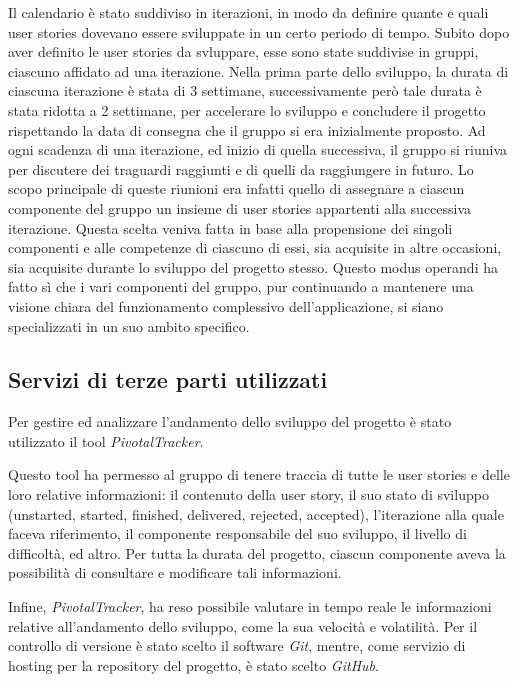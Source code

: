 \documentclass[binding=0.6cm,Lau]{sapthesis}
\begin{document}
Il calendario è stato suddiviso in iterazioni, in modo da definire
quante e quali user stories dovevano essere sviluppate in un certo
periodo di tempo. Subito dopo aver definito le user stories da
svluppare, esse sono state suddivise in gruppi, ciascuno affidato ad
una iterazione. Nella prima parte dello sviluppo, la durata di
ciascuna iterazione è stata di 3 settimane, successivamente però tale
durata è stata ridotta a 2 settimane, per accelerare lo sviluppo e
concludere il progetto rispettando la data di consegna che il gruppo
si era inizialmente proposto.  Ad ogni scadenza di una iterazione, ed
inizio di quella successiva, il gruppo si riuniva per discutere dei
traguardi raggiunti e di quelli da raggiungere in futuro. Lo scopo
principale di queste riunioni era infatti quello di assegnare a
ciascun componente del gruppo un insieme di user stories appartenti
alla successiva iterazione.  Questa scelta veniva fatta in base alla
propensione dei singoli componenti e alle competenze di ciascuno di
essi, sia acquisite in altre occasioni, sia acquisite durante lo
sviluppo del progetto stesso. Questo modus operandi ha fatto sì che i
vari componenti del gruppo, pur continuando a mantenere una visione
chiara del funzionamento complessivo dell'applicazione, si siano
specializzati in un suo ambito specifico.

\subsection{Servizi di terze parti utilizzati}

Per gestire ed analizzare l'andamento dello sviluppo del progetto è
stato utilizzato il tool \textit{PivotalTracker}.

Questo tool ha permesso al gruppo di tenere traccia di tutte le user
stories e delle loro relative informazioni: il contenuto della user
story, il suo stato di sviluppo (unstarted, started, finished, delivered,
rejected, accepted), l'iterazione alla quale faceva riferimento, il
componente responsabile del suo sviluppo, il livello di difficoltà, ed
altro. Per tutta la durata del progetto, ciascun componente aveva la
possibilità di consultare e modificare tali informazioni.

Infine, \textit{PivotalTracker}, ha reso possibile valutare in tempo
reale le informazioni relative all'andamento dello sviluppo, come la
sua velocità e volatilità.
\newline
\newline
Per il controllo di versione è stato scelto il software \textit{Git},
mentre, come servizio di hosting per la repository del progetto, è
stato scelto \textit{GitHub}.
\end{document}

